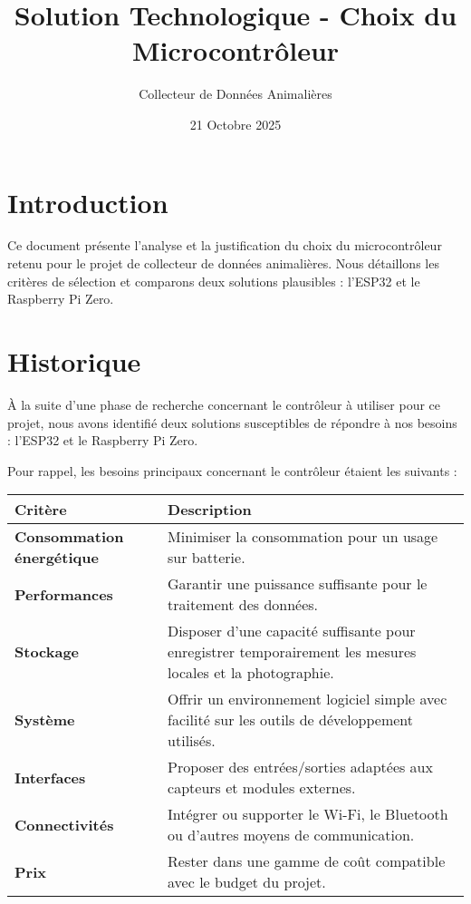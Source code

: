 \documentclass{param}
\title{Solution Technologique - Choix du Microcontrôleur}
\author{Collecteur de Données Animalières}
\date{21 Octobre 2025}
\begin{document}
\maketitle

\section{Introduction}
Ce document présente l'analyse et la justification du choix du microcontrôleur retenu pour le projet de collecteur de données animalières. Nous détaillons les critères de sélection et comparons deux solutions plausibles : l'ESP32 et le Raspberry Pi Zero.
\vspace{20px}

\section{Historique}
À la suite d'une phase de recherche concernant le contrôleur à utiliser pour ce projet, nous avons identifié deux solutions susceptibles de répondre à nos besoins : l'ESP32 et le Raspberry Pi Zero.

\medskip
\noindent
Pour rappel, les besoins principaux concernant le contrôleur étaient les suivants :

\begin{center}
\renewcommand{\arraystretch}{1.3}
\begin{tabularx}{0.9\textwidth}{>{\bfseries}l|X}
\toprule
\textbf{Critère} & \textbf{Description} \\
\midrule
Consommation énergétique & Minimiser la consommation pour un usage sur batterie. \\ 
Performances & Garantir une puissance suffisante pour le traitement des données. \\ 
Stockage & Disposer d’une capacité suffisante pour enregistrer temporairement les mesures locales et la photographie. \\ 
Système & Offrir un environnement logiciel simple avec facilité sur les outils de développement utilisés. \\ 
Interfaces & Proposer des entrées/sorties adaptées aux capteurs et modules externes. \\ 
Connectivités & Intégrer ou supporter le Wi-Fi, le Bluetooth ou d'autres moyens de communication. \\ 
Prix & Rester dans une gamme de coût compatible avec le budget du projet. \\ 
\bottomrule
\end{tabularx}
\end{center}
\end{document}

